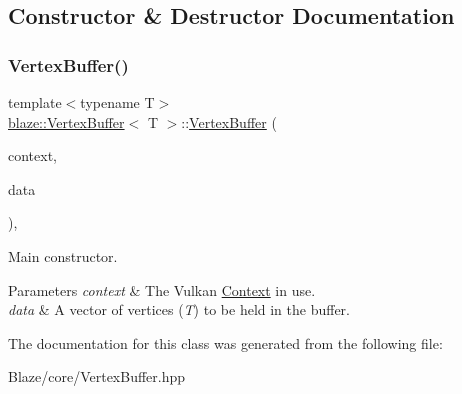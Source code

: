 \subsection{Constructor \& Destructor Documentation}
\mbox{\label{classblaze_1_1VertexBuffer_a6852238a5dfe856d9cee5532498ecdcc}} 
\subsubsection{\texorpdfstring{Vertex\+Buffer()}{VertexBuffer()}}
{\footnotesize\ttfamily template$<$typename T$>$ \\
\hyperlink{classblaze_1_1VertexBuffer}{blaze\+::\+Vertex\+Buffer}$<$ T $>$\+::\hyperlink{classblaze_1_1VertexBuffer}{Vertex\+Buffer} (\begin{DoxyParamCaption}\item[{const \hyperlink{classblaze_1_1Context}{Context} $\ast$}]{context,  }\item[{const std\+::vector$<$ T $>$ \&}]{data }\end{DoxyParamCaption})\hspace{0.3cm}{\ttfamily [inline]}, {\ttfamily [noexcept]}}



Main constructor. 


\begin{DoxyParams}{Parameters}
{\em context} & The Vulkan \hyperlink{classblaze_1_1Context}{Context} in use. \\
\hline
{\em data} & A vector of vertices ({\itshape T}) to be held in the buffer. \\
\hline
\end{DoxyParams}


The documentation for this class was generated from the following file\+:\begin{DoxyCompactItemize}
\item 
Blaze/core/Vertex\+Buffer.\+hpp\end{DoxyCompactItemize}
